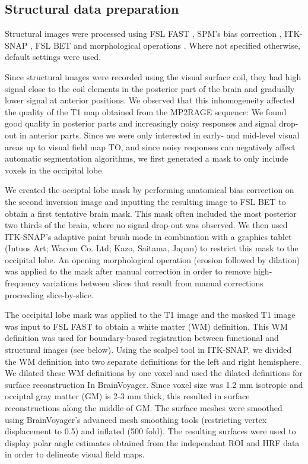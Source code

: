 \subsection{Structural data preparation}
Structural images were processed using FSL FAST \parencite{Zhang2001}, SPM's bias correction \parencite{Ashburner2005}, ITK-SNAP \parencite{py06nimg}, FSL BET \parencite{Smith2002} and morphological operations \parencite{scipy2001}. Where not specified otherwise, default settings were used. 

 Since structural images were recorded using the visual surface coil, they had high signal close to the coil elements in the posterior part of the brain and gradually lower signal at anterior positions. We observed that this inhomogeneity affected the quality of the T1 map obtained from the MP2RAGE sequence: We found good quality in posterior parts and increasingly noisy responses and signal drop-out in anterior parts. Since we were only interested in early- and mid-level visual areas up to visual field map TO, and since noisy responses can negatively affect automatic segmentation algorithms, we first generated a mask to only include voxels in the occipital lobe.

We created the occiptal lobe mask by performing anatomical bias correction on the second inversion image and inputting the resulting image to FSL BET to obtain a first tentative brain mask. This mask often included the most posterior two thirds of the brain, where no signal drop-out was observed. We then used ITK-SNAP's adaptive paint brush mode in combination with a graphics tablet (Intuos Art; Wacom Co. Ltd; Kazo, Saitama, Japan) to restrict this mask to the occipital lobe. An opening morphological operation (erosion followed by dilation) was applied to the mask after manual correction in order to remove high-frequency variations between slices that result from manual corrections proceeding slice-by-slice.

The occipital lobe mask was applied to the T1 image and the masked T1 image was input to FSL FAST to obtain a white matter (WM) definition. This WM definition was used for boundary-based registration between functional and structural images (see below). Using the scalpel tool in ITK-SNAP, we divided the WM definition into two separate definitions for the left and right hemisphere. We dilated these WM definitions by one voxel and used the dilated definitions for surface reconstruction In BrainVoyager. Since voxel size was 1.2 mm isotropic and occiptal gray matter (GM) is 2-3 mm thick, this resulted in surface reconstructions along the middle of GM. The surface meshes were smoothed using BrainVoyager's advanced mesh smoothing tools (restricting vertex displacement to 0.5) and inflated (500 fold). The resulting surfaces were used to display polar angle estimates obtained from the independant ROI and HRF data in order to delineate visual field maps.

